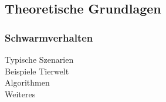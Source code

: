 \subsection{Theoretische Grundlagen}
\subsubsection{Schwarmverhalten}
Typische Szenarien\\
Beispiele Tierwelt\\
Algorithmen\\
Weiteres
